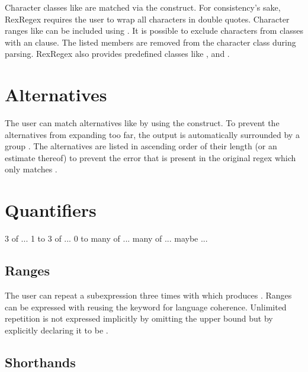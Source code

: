 Character classes like \pattern{[abc]} are matched via the  construct. For consistency's sake, RexRegex requires the user to wrap all characters in double quotes. Character ranges like \pattern{[a-z]} can be included using . It is possible to exclude characters from classes with an  clause. The listed members are removed from the character class during parsing. RexRegex also provides predefined classes like ,  and . 

\section{Alternatives}

The user can match alternatives like  by using the  construct. To prevent the alternatives from expanding too far, the output is automatically surrounded by a group . The alternatives are listed in ascending order of their length (or an estimate thereof) to prevent the error that is present in the original regex which only matches .

\section{Quantifiers}

\begin{rexregexBox}[title={Quantifiers in RexRegex},label=code:quantifiersInRexRegex,width=10cm,center]
3 of ...
1 to 3 of ...
0 to many of ...
many of ...
maybe ...
\end{rexregexBox}

\subsection{Ranges} \label{sec:dslQuantifierRanges}

The user can repeat a subexpression three times with  which produces . Ranges can be expressed with  reusing the  keyword for language coherence. Unlimited repetition is not expressed implicitly by omitting the upper bound  but by explicitly declaring it to be .

\subsection{Shorthands}

